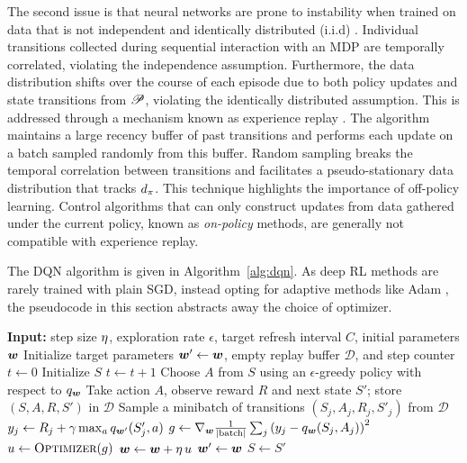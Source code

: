   The second issue is that neural networks are prone to instability when trained on data that is not independent and identically distributed (i.i.d) . Individual transitions collected during sequential interaction with an MDP are temporally correlated, violating the independence assumption. Furthermore, the data distribution shifts over the course of each episode due to both policy updates and state transitions from $\mathscr{P}$, violating the identically distributed assumption. This is addressed through a mechanism known as experience replay . The algorithm maintains a large recency buffer of past transitions and performs each update on a batch sampled randomly from this buffer. Random sampling breaks the temporal correlation between transitions and facilitates a pseudo-stationary data distribution that tracks $d_{\pi}$. This technique highlights the importance of off-policy learning. Control algorithms that can only construct updates from data gathered under the current policy, known as \textit{on-policy} methods, are generally not compatible with experience replay. 
  
  The DQN algorithm is given in Algorithm~\ref{alg:dqn}. As deep RL methods are rarely trained with plain SGD, instead opting for adaptive methods like Adam \cite{kingma2015adam}, the pseudocode in this section abstracts away the choice of optimizer.
  
  \begin{algorithm}[t]
  \caption{Deep Q-Learning (DQN)}
  \label{alg:dqn}
  \begin{algorithmic}[1]
  \State \textbf{Input:} step size $\eta$, exploration rate $\epsilon$, target refresh interval $C$, initial parameters ${\bm w}$
  \State Initialize target parameters ${\bm w}' \gets {\bm w}$, empty replay buffer $\mathcal{D}$, and step counter $t \gets 0$
      \State Initialize $S$
          \State $t \gets t + 1$
          \State Choose $A$ from $S$ using an $\epsilon$-greedy policy with respect to $q_{\bm w}$
          \State Take action $A$, observe reward $R$ and next state $S'$; store $(S, A, R, S')$ in $\mathcal{D}$
          \State Sample a minibatch of transitions $(S_j, A_j, R_j, S'_j)$ from $\mathcal{D}$
          \State $y_j \gets R_j + \gamma \max_{a} q_{{\bm w}'}(S'_j, a)$ 
          \State $g \gets \nabla_{{\bm w}} \frac{1}{|\text{batch}|}\sum_j \left( y_j - q_{\bm w}(S_j, A_j) \right)^2$ 
          \State $\update \gets \textproc{Optimizer}(g)$ 
          \State ${\bm w} \gets {\bm w} + \eta\, u$
              \State ${\bm w}' \gets {\bm w}$ 
          \EndIf
          \State $S \gets S'$
      \EndWhile
  \EndFor
  \end{algorithmic}
  \end{algorithm}
  
